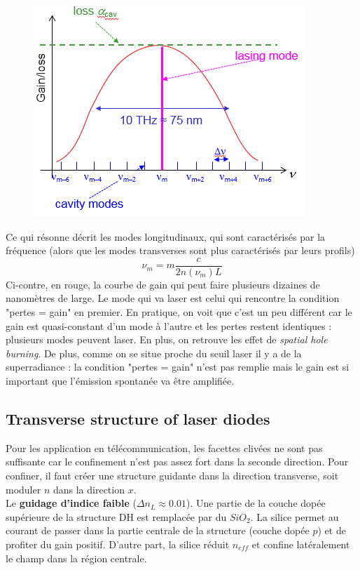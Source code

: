 \newpage

	\begin{figure}
	\includegraphics[scale=0.7]{ch4/image14}
	\end{figure}
Ce qui résonne décrit les modes longitudinaux, qui sont caractérisés par la fréquence (alors que les
modes transverses sont plus caractérisés par leurs profils)
\begin{equation}
{\nu _m} = m\frac{c}{{2n({\nu _m})L}}
\end{equation}
Ci-contre, en rouge, la courbe de gain qui peut faire plusieurs dizaines de nanomètres de large. Le mode
qui va laser est celui qui rencontre la condition "pertes = gain" en premier. En pratique, on voit
que c'est un peu différent car le gain est quasi-constant d'un mode à l'autre et les pertes restent
identiques : plusieurs modes peuvent laser. En plus, on retrouve les effet de \textit{spatial hole
burning}. De plus, comme on se situe proche du seuil laser il y a de la superradiance : la condition
"pertes = gain" n'est pas remplie mais le gain est si important que l'émission spontanée va être 
amplifiée.

\subsection{Transverse structure of laser diodes}
Pour les application en télécommunication, les facettes clivées ne sont pas suffisante car le 
confinement n'est pas assez fort dans la seconde direction. Pour confiner, il faut créer une 
structure guidante dans la direction transverse, soit moduler $n$ dans la direction $x$.\\

Le \textbf{guidage d'indice faible} ($\Delta n_L\approx0.01$). Une partie de la couche dopée 
supérieure de la structure DH est remplacée par du $SiO_2$. La silice permet au courant de passer
dans la partie centrale de la structure (couche dopée $p$) et de profiter du gain positif. D'autre
part, la silice réduit $n_{eff}$ et confine latéralement le champ dans la région centrale.

